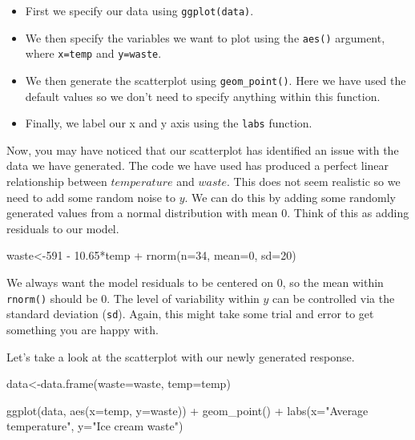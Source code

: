 \documentclass[
]{book}
\newenvironment{Shaded}{\begin{snugshade}}{\end{snugshade}}
\newcommand{\AttributeTok}[1]{\textcolor[rgb]{0.77,0.63,0.00}{#1}}
\newcommand{\DecValTok}[1]{\textcolor[rgb]{0.00,0.00,0.81}{#1}}
\newcommand{\FloatTok}[1]{\textcolor[rgb]{0.00,0.00,0.81}{#1}}
\newcommand{\FunctionTok}[1]{\textcolor[rgb]{0.00,0.00,0.00}{#1}}
\newcommand{\NormalTok}[1]{#1}
\newcommand{\OtherTok}[1]{\textcolor[rgb]{0.56,0.35,0.01}{#1}}
\newcommand{\SpecialCharTok}[1]{\textcolor[rgb]{0.00,0.00,0.00}{#1}}
\newcommand{\StringTok}[1]{\textcolor[rgb]{0.31,0.60,0.02}{#1}}
\providecommand{\tightlist}{%
  \setlength{\itemsep}{0pt}\setlength{\parskip}{0pt}}
\begin{document}
\begin{itemize}
\tightlist
\item
  First we specify our data using \texttt{ggplot(data)}.
\item
  We then specify the variables we want to plot using the \texttt{aes()} argument, where \texttt{x=temp} and \texttt{y=waste}.
\item
  We then generate the scatterplot using \texttt{geom\_point()}. Here we have used the default values so we don't need to specify anything within this function.
\item
  Finally, we label our x and y axis using the \texttt{labs} function.
\end{itemize}

Now, you may have noticed that our scatterplot has identified an issue with the data we have generated. The code we have used has produced a perfect linear relationship between \(temperature\) and \(waste\). This does not seem realistic so we need to add some random noise to \(y\). We can do this by adding some randomly generated values from a normal distribution with mean 0. Think of this as adding residuals to our model.

\begin{Shaded}
\begin{Highlighting}[]
\NormalTok{waste}\OtherTok{\textless{}{-}}\DecValTok{591} \SpecialCharTok{{-}} \FloatTok{10.65}\SpecialCharTok{*}\NormalTok{temp }\SpecialCharTok{+} \FunctionTok{rnorm}\NormalTok{(}\AttributeTok{n=}\DecValTok{34}\NormalTok{, }\AttributeTok{mean=}\DecValTok{0}\NormalTok{, }\AttributeTok{sd=}\DecValTok{20}\NormalTok{)}
\end{Highlighting}
\end{Shaded}

We always want the model residuals to be centered on 0, so the mean within \texttt{rnorm()} should be 0. The level of variability within \(y\) can be controlled via the standard deviation (\texttt{sd}). Again, this might take some trial and error to get something you are happy with.

Let's take a look at the scatterplot with our newly generated response.

\begin{Shaded}
\begin{Highlighting}[]
\NormalTok{data}\OtherTok{\textless{}{-}}\FunctionTok{data.frame}\NormalTok{(}\AttributeTok{waste=}\NormalTok{waste, }\AttributeTok{temp=}\NormalTok{temp)}

\FunctionTok{ggplot}\NormalTok{(data, }\FunctionTok{aes}\NormalTok{(}\AttributeTok{x=}\NormalTok{temp, }\AttributeTok{y=}\NormalTok{waste)) }\SpecialCharTok{+} 
  \FunctionTok{geom\_point}\NormalTok{() }\SpecialCharTok{+} 
  \FunctionTok{labs}\NormalTok{(}\AttributeTok{x=}\StringTok{"Average temperature"}\NormalTok{, }\AttributeTok{y=}\StringTok{"Ice cream waste"}\NormalTok{)}
\end{Highlighting}
\end{Shaded}
\end{document}

